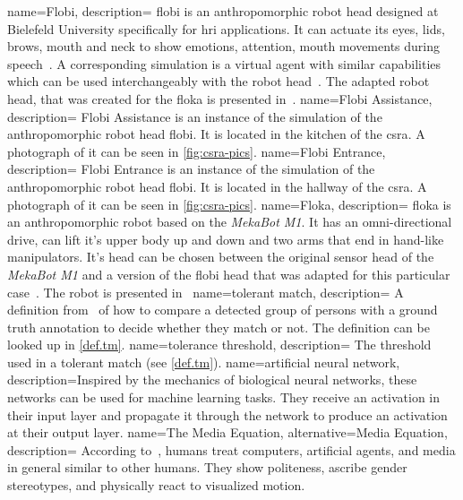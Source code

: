 {
	name={Flobi},
	description={
		\gls{flobi} is an anthropomorphic \gls{robot} head designed at Bielefeld University specifically for \gls{hri} applications. 
		It can actuate its eyes, lids, brows, mouth and neck to show emotions, attention, mouth movements during speech~\cite[]{Lutkebohle2010}.
		A corresponding simulation is a \gls{virtual agent} with similar capabilities which can be used interchangeably with the \gls{robot} head~\cite[]{Lier2012}.
		The adapted \gls{robot} head, that was created for the \gls{floka} is presented in~\cite{Schulz2019}.
		}
}
{
	name={Flobi Assistance},
	description={
		\gls{Flobi Assistance} is an instance of the simulation of the anthropomorphic \gls{robot} head \gls{flobi}.
		It is located in the kitchen of the \gls{csra}.
		A photograph of it can be seen in \vref{fig:csra-pics}.
		}
}
{
	name={Flobi Entrance},
	description={
		\gls{Flobi Entrance} is an instance of the simulation of the anthropomorphic \gls{robot} head \gls{flobi}.
		It is located in the hallway of the \gls{csra}.
		A photograph of it can be seen in \vref{fig:csra-pics}.
		}
}
{
	name={Floka},
	description={
		\gls{floka} is an anthropomorphic \gls{robot} based on the \emph{MekaBot M1}.
		It has an omni-directional drive, can lift it's upper body up and down and two arms that end in hand-like manipulators.
		It's head can be chosen between the original sensor head of the \emph{MekaBot M1} and a version of the \gls{flobi} head that was adapted for this particular case~\cite{Schulz2019}.
		The \gls{robot} is presented in~\cite{Meyer2017}
		}
}
{
	name={tolerant match},
	description={
		A definition from~\cite{Setti2015} of how to compare a detected group of persons with a ground truth annotation to decide whether they match or not.
		The definition can be looked up in \cref{def.tm}.
		}
}
{
	name={tolerance threshold},
	description={
		The threshold used in a \gls{tolerant match} (see \cref{def.tm}).
		}
}
{
	name={artificial neural network},
	description={Inspired by the mechanics of biological neural networks, these networks can be used for machine learning tasks. They receive an activation in their input layer and propagate it through the network to produce an activation at their output layer.}
}
{
	name={The Media Equation},
	alternative={Media Equation},
	description={
		According to~\cite{Reeves1996}, humans treat computers, \glspl{artificial agent}, and media in general similar to other humans.
		They show politeness, ascribe gender stereotypes, and physically react to visualized motion.
		}
}
